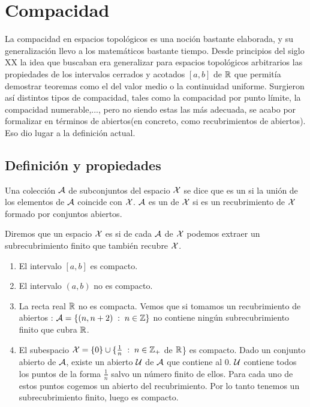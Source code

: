 \chapter{Compacidad}
\label{comp}

La compacidad en espacios topológicos es una noción bastante elaborada, y su generalización llevo a los matemáticos bastante tiempo. Desde principios del siglo XX la idea que buscaban era generalizar para espacios topológicos arbitrarios las propiedades de los intervalos cerrados y acotados $[a,b]$ de $\mathbb{R}$ que permitía demostrar teoremas como el del valor medio o la continuidad uniforme. Surgieron así distintos tipos de compacidad, tales como la compacidad por punto límite, la compacidad numerable,...,  pero no siendo estas las más adecuada, se acabo por formalizar en términos de abiertos(en concreto, como recubrimientos de abiertos). Eso dio lugar a la definición actual.

\section{Definición y propiedades}

\begin{defi}
	Una colección $\mathcal{A}$ de subconjuntos del espacio $\mathcal{X}$ se dice que es un  si la unión de los elementos de $\mathcal{A}$ coincide con $\mathcal{X}$. $\mathcal{A}$ es un  de $\mathcal{X}$ si es un recubrimiento de $\mathcal{X}$ formado por conjuntos abiertos.
\end{defi}

\begin{defi}[Compacto]
	Diremos que un espacio $\mathcal{X}$ es   si de cada  $\mathcal{A}$ de $\mathcal{X}$ podemos extraer un subrecubrimiento finito que también recubre $\mathcal{X}$.
\end{defi}

\begin{exa}
	\begin{enumerate}
		\item El intervalo $[a,b]$ es compacto.
		\item El intervalo $(a,b)$ no es compacto.
		\item La recta real $\mathbb{R}$ no es compacta. Vemos que si tomamos un recubrimiento de abiertos : $\mathcal{A}=\{(n,n+2) \;:\; n \in \mathbb{Z}\}$ no contiene ningún subrecubrimiento finito que cubra $\mathbb{R}$.
		\item El subespacio $\mathcal{X} = \{0\} \cup \{\frac{1}{n} \;:\; n \in \mathbb{Z}_{+}$ de $\mathbb{R}$\} es compacto.
		Dado un conjunto abierto de $\mathcal{A}$, existe un abierto $\mathcal{U}$ de $\mathcal{A}$ que contiene al $0$. $\mathcal{U}$ contiene todos los puntos de la forma $\frac{1}{n}$ salvo un número finito de ellos. Para cada uno de estos puntos cogemos un abierto del recubrimiento. Por lo tanto tenemos un subrecubrimiento finito, luego es compacto. 
	\end{enumerate}
\end{exa}

